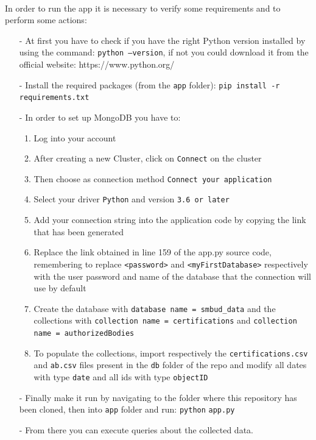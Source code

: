 \documentclass[a4paper,12pt]{article}
\begin{document}
\paragraph{}
In order to run the app it is necessary to verify some requirements and to perform some actions:
  \begin{itemize}[noitemsep]
   \item[-] At first you have to check if you have the right Python version installed by using the command: \texttt{python --version}, if not you could download it from the official website: https://www.python.org/ 
   \item[-] Install the required packages (from the \texttt{app} folder): \texttt{pip install -r requirements.txt}
   \item[-] In order to set up MongoDB you have to:
  	\begin{enumerate}[noitemsep]
  		\item Log into your account
  		\item After creating a new Cluster, click on  \texttt{Connect} on the cluster
		\item Then choose as connection method \texttt{Connect your application}
		\item Select your driver \texttt{Python} and version \texttt{3.6 or later}
		\item Add your connection string into the application code by copying the link that has been generated
		\item Replace the link obtained in line 159 of the app.py source code, remembering to replace \texttt{<password>} and \texttt{<myFirstDatabase>} respectively with the user password and name of the database that the connection will use by default
		\item Create the database with \texttt{database name = smbud\_data} and the collections with \texttt{collection name = certifications} and \texttt{collection name = authorizedBodies}
		\item To populate the collections, import respectively the \texttt{certifications.csv} and \texttt{ab.csv} files present in the \texttt{db} folder of the repo and modify all dates with type \texttt{date} and all ids with type \texttt{objectID}

  	\end{enumerate}
	\item[-] Finally make it run by navigating to the folder where this repository has been cloned, then into \texttt{app} folder and run: \texttt{python} \texttt{app.py}
	\item[-] From there you can execute queries about the collected data.
  \end{itemize}
\end{document}
